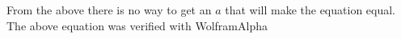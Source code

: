 \documentclass[12pt]{article}
\begin{document}
\begin{enumerate}
\begin{enumerate}
From the above there is no way to get an $a$ that will make the equation equal.
The above equation was verified with WolframAlpha

\end{enumerate}

\end{enumerate}
\end{document}
